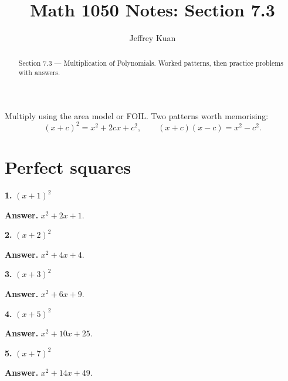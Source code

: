 \documentclass{ximera}
\author{Jeffrey Kuan}
\title{Math 1050 Notes: Section 7.3}
\begin{document}
\begin{abstract}
    Section 7.3 --- Multiplication of Polynomials.
    Worked patterns, then practice problems with answers.
\end{abstract}

\maketitle

Multiply using the area model or FOIL. Two patterns worth memorising:
\[
  (x+c)^{2}=x^{2}+2cx+c^{2}, \qquad (x+c)(x-c)=x^{2}-c^{2}.
\]

\section*{Perfect squares}

\begin{problem}

\textbf{1.} $(x+1)^{2}$

\begin{hint}
\textbf{Answer.} $x^{2} + 2x + 1$.
\end{hint}
\end{problem}

\begin{problem}

\textbf{2.} $(x+2)^{2}$

\begin{hint}
\textbf{Answer.} $x^{2} + 4 x + 4$.
\end{hint}
\end{problem}

\begin{problem}

\textbf{3.} $(x+3)^{2}$

\begin{hint}
\textbf{Answer.} $x^{2} + 6 x + 9$.
\end{hint}
\end{problem}

\begin{problem}

\textbf{4.} $(x+5)^{2}$

\begin{hint}
\textbf{Answer.} $x^{2} + 10 x + 25$.
\end{hint}
\end{problem}

\begin{problem}

\textbf{5.} $(x+7)^{2}$

\begin{hint}
\textbf{Answer.} $x^{2} + 14 x + 49$.
\end{hint}
\end{problem}
\end{document}
